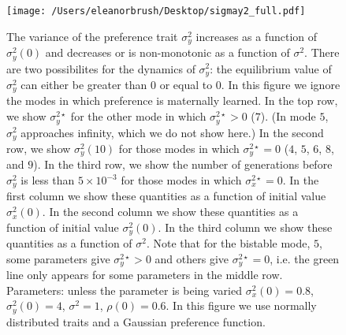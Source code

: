 \documentclass{article}
\begin{document}
\begin{figure}
\texttt{[image: /Users/eleanorbrush/Desktop/sigmay2\_full.pdf]}
\caption{\label{sigmay2_full} The variance of the preference trait $\sigma_y^{2}$ increases as a function of $\sigma_y^2(0)$ and decreases or is non-monotonic as a function of $\sigma^2$. There are two possibilites for the dynamics of $\sigma_y^2$: the equilibrium value of $\sigma_y^2$ can either be greater than $0$ or equal to $0$. In this figure we ignore the modes in which preference is maternally learned. In the top row, we show $\sigma_y^{2\star}$ for the other mode in which $\sigma_y^{2\star}>0$ ($7$). (In mode $5$, $\sigma_y^2$ approaches infinity, which we do not show here.) In the second row, we show $\sigma_y^2(10)$  for those modes in which $\sigma_y^{2\star}=0$ ($4$, $5$, $6$, $8$, and $9$). In the third row, we show the number of generations before $\sigma_y^2$ is less than $5\times10^{-3}$ for those modes in which $\sigma_x^{2\star}=0$. In the first column we show these quantities as a function of initial value $\sigma_x^{2}(0)$. In the second column we show these quantities as a function of initial value $\sigma_y^2(0)$. In the third column we show these quantities as a function of $\sigma^2$. Note that for the bistable mode, $5$, some parameters give $\sigma_y^{2\star}>0$ and others give $\sigma_y^{2\star}=0$, i.e. the green line only appears for some parameters in the middle row.  Parameters: unless the parameter is being varied $\sigma_x^2(0)=0.8$, $\sigma_y^2(0)=4$, $\sigma^2=1$, $\rho(0)=0.6$. In this figure we use normally distributed traits and a Gaussian preference function.}
\end{figure}
\end{document}
